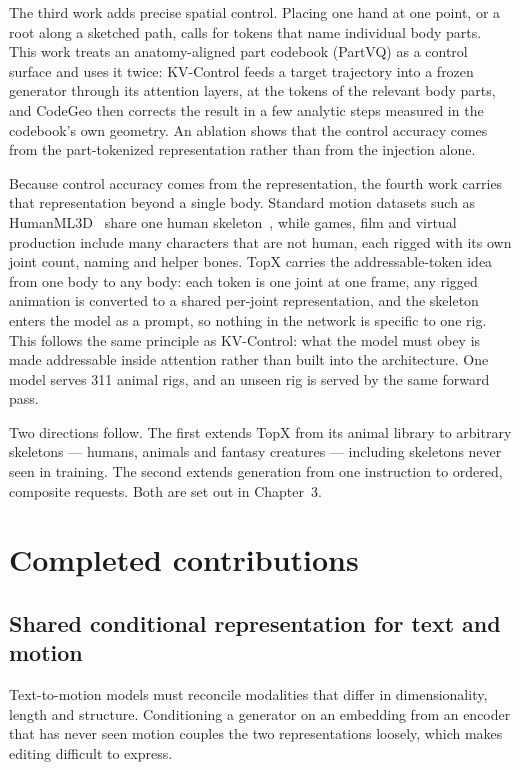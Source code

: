 \documentclass[11pt,a4paper]{report}
\begin{document}
The third work adds precise spatial control. Placing one hand at one point, or a
root along a sketched path, calls for tokens that name individual body parts.
This work treats an anatomy-aligned part codebook (PartVQ) as a control surface
and uses it twice: KV-Control feeds a target trajectory into a frozen generator
through its attention layers, at the tokens of the relevant body parts, and
CodeGeo then corrects the result in a few analytic steps measured in the
codebook's own geometry. An ablation shows that the control accuracy comes from
the part-tokenized representation rather than from the injection alone.

Because control accuracy comes from the representation, the fourth work carries
that representation beyond a single body. Standard motion datasets such as
HumanML3D~\cite{guo2022generating} share one human
skeleton~\cite{loper2015smpl}, while games, film and virtual production include
many characters that are not human, each rigged with its own joint count, naming
and helper bones. TopX carries the addressable-token idea from one body to any
body: each token is one joint at one frame, any rigged animation is converted to
a shared per-joint representation, and the skeleton enters the model as a
prompt, so nothing in the network is specific to one rig. This follows the same
principle as KV-Control: what the model must obey is made addressable inside
attention rather than built into the architecture. One model serves 311 animal
rigs, and an unseen rig is served by the same forward pass.

Two directions follow. The first extends TopX from its animal library to
arbitrary skeletons --- humans, animals and fantasy creatures --- including
skeletons never seen in training. The second extends generation from one
instruction to ordered, composite requests. Both are set out in Chapter~3.

\section{Completed contributions}

\subsection{Shared conditional representation for text and motion}

Text-to-motion models must reconcile modalities that differ in dimensionality,
length and structure. Conditioning a generator on an embedding from an encoder
that has never seen motion couples the two representations loosely, which makes
editing difficult to express.
\end{document}
